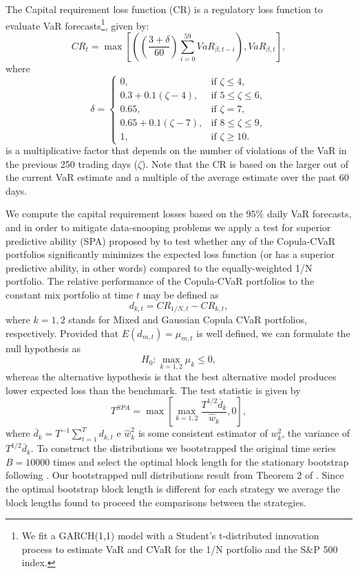 \documentclass[a4paper,10pt]{article}
\begin{document}
The Capital requirement loss function (CR) is a regulatory loss function to evaluate VaR forecasts\footnote{We fit a GARCH(1,1) model with a Student's t-distributed innovation process to estimate VaR and CVaR for the 1/N portfolio and the S\&P 500 index.}, given by:
\begin{equation}CR_{t} =\max \left [\left (\genfrac{(}{)}{}{}{3 +\delta }{60}\sum _{i =0}^{59}VaR_{\beta  ,t -i}\right ) ,VaR_{\beta  ,t}\right ] ,
\end{equation} 
where
\begin{equation*}
\delta  = \begin{cases}
0,& \text{if }\zeta \leq 4, \\ 
0.3+0.1\left( \zeta -4\right),& \text{if }5\leq \zeta \leq 6, \\ 
0.65,& \text{if }\zeta =7, \\ 
0.65+0.1\left( \zeta -7\right),&\text{if }8\leq \zeta \leq 9, \\ 
1,&\text{if }\zeta \geq 10.
\end{cases}
\end{equation*}
is a multiplicative factor that depends on the number of violations of the VaR in the previous 250 trading days ($\zeta$). Note that the CR is based on the larger out of the current VaR estimate and a multiple of the average estimate over the past 60 days.

We compute the capital requirement losses based on the $95\%$ daily VaR forecasts, and in order to mitigate data-snooping problems we apply a test for superior predictive ability (SPA) proposed by \citet*{hansen2005test} to test whether any of the Copula-CVaR portfolios significantly minimizes the expected loss function (or has a superior predictive ability, in other words) compared to the equally-weighted 1/N portfolio. The relative performance of the Copula-CVaR portfolios to the constant mix portfolio at time $t$ may be defined as 
\[d_{k,t}=CR_{1/N,t}-CR_{k,t},\]%
where $k = 1, 2$ stands for Mixed and Gaussian Copula CVaR portfolios, respectively. Provided that $E\left( d_{m,t}\right) =\mu _{m,t}$ is well defined, we can formulate the null hypothesis as 
\[H_{0}:\underset{k=1,2}{\max }\mu _{k}\leq 0,\]
whereas the alternative hypothesis is that the best alternative model produces lower expected loss than the benchmark. The test statistic is given by 
\[T^{SPA}=\max \left[\underset{k=1,2}{\max } \frac{T^{1/2}\overline{d}_{k}}{\widehat{w}_{k}},0\right] ,
\]
where $\overline{d}_{k}=T^{-1}\sum_{t=1}^{T}d_{k,t}$ e $\widehat{w}_{k}^{2}$ is some consistent estimator of $w_{k}^{2}$, the variance of $T^{1/2}\overline{d}_{k}$. To construct the distributions we bootstrapped the original time series $B=10000$ times and select the optimal block length for the stationary bootstrap following \citet*{pw04}. Our bootstrapped null distributions result from Theorem 2 of \citet*{pr94}. Since the optimal bootstrap block length is different for each strategy we average the block lengths found to proceed the comparisons between the strategies.
\end{document}
